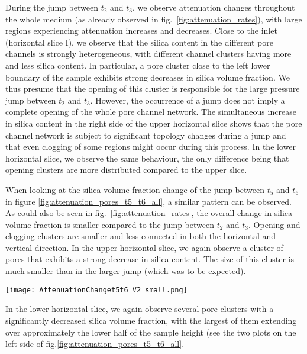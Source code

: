 \documentclass[smallextended]{svjour3}       %
\begin{document}
During the jump between $t_2$ and $t_3$, we observe attenuation changes throughout the whole medium (as already observed in  fig.~\ref{fig:attenuation_rates}), with large regions experiencing attenuation increases and decreases. Close to the inlet (horizontal slice I), we observe that the silica content in the different pore channels is strongly heterogeneous, with different channel clusters having more and less silica content. In particular, a pore cluster close to the left lower boundary of the sample exhibits strong decreases in silica volume fraction. We thus presume that the opening of this cluster is responsible for the large pressure jump between $t_2$ and $t_3$. However, the occurrence of a jump does not imply a complete opening of the whole pore channel network. The simultaneous increase in silica content in the right side of the upper horizontal slice shows that the pore channel network is subject to significant topology changes during a jump and that even clogging of some regions might occur during this process.
In the lower horizontal slice, we observe the same behaviour, the only difference being that opening clusters are more distributed compared to the upper slice.

When looking at the silica volume fraction change of the jump between $t_5$ and $t_6$ in figure \ref{fig:attenuation_pores_t5_t6_all}, a similar pattern can be observed. As could also be seen in fig.~\ref{fig:attenuation_rates}, the overall change in silica volume fraction is smaller compared to the jump between $t_2$ and $t_3$. Opening and clogging clusters are smaller and less connected in both the horizontal and vertical direction. In the upper horizontal slice, we again observe a cluster of pores that exhibits a strong decrease in silica content. The size of this cluster is much smaller than in the larger jump (which was to be expected). 
\begin{figure*}[hbtp]
\texttt{[image: AttenuationChanget5t6\_V2\_small.png]}%
\caption{\label{fig:attenuation_pores_t5_t6_all} Same as fig.\ref{fig:attenuation_pores_t2_t3_all}, but for the pressure jump between $t_5$ and $t_6$.}
\end{figure*}
In the lower horizontal slice, we again observe several pore clusters with a significantly decreased silica volume fraction, with the largest of them extending over approximately the lower half of the sample height (see the two plots on the left side of fig.\ref{fig:attenuation_pores_t5_t6_all}.
\end{document}
